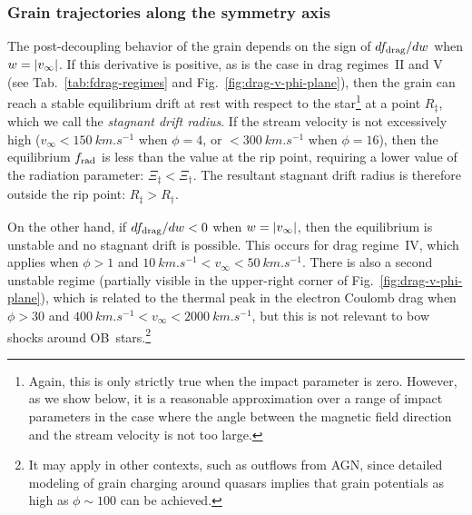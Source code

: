 \subsubsection{Grain trajectories along the symmetry axis}
\label{sec:grain-traj-along}

The post-decoupling behavior of the grain depends on the sign of
\(d f_{\text{drag}} / d w\) when \(w = \lvert v_\infty\rvert\).  If this derivative is
positive, as is the case in drag regimes~II and V (see
Tab.~\ref{tab:fdrag-regimes} and Fig.~\ref{fig:drag-v-phi-plane}),
then the grain can reach a stable equilibrium drift at rest with
respect to the star\footnote{%
  Again, this is only strictly true when the impact parameter is zero.
  However, as we show below, it is a reasonable approximation over a
  range of impact parameters in the case where the angle between the
  magnetic field direction and the stream velocity is not too
  large.} %
at a point \(R_\ddag\), which we call the \textit{stagnant drift
  radius}. If the stream velocity is not excessively high
(\(v_\infty < \SI{150}{km.s^{-1}}\) when \(\phi = 4\), or
\(< \SI{300}{km.s^{-1}}\) when \(\phi = 16\)), then the equilibrium
\(f_{\text{rad}}\) is less than the value at the rip point, requiring a lower
value of the radiation parameter: \(\Xi_\ddag < \Xi_\dag\).  The resultant
stagnant drift radius is therefore outside the rip point:
\(R_\ddag > R_\dag\).

On the other hand, if \(d f_{\text{drag}} / d w < 0\) when
\(w = \lvert v_\infty\rvert\), then the equilibrium is unstable and no stagnant
drift is possible.  This occurs for drag regime~IV, which applies when
\(\phi > 1\) and
\(\SI{10}{km.s^{-1}} < v_\infty < \SI{50}{km.s^{-1}}\).  There is also a
second unstable regime (partially visible in the upper-right corner of
Fig.~\ref{fig:drag-v-phi-plane}), which is related to the thermal peak
in the electron Coulomb drag when \(\phi > 30\) and
\(\SI{400}{km.s^{-1}} < v_\infty < \SI{2000}{km.s^{-1}}\), but this is not
relevant to bow shocks around OB~stars.\footnote{%
  It may apply in other contexts, such as outflows from AGN, since
  detailed modeling of grain charging around quasars
  \citep{Weingartner:2006a} implies that grain potentials as high as
  \(\phi \sim 100\) can be achieved.} %

